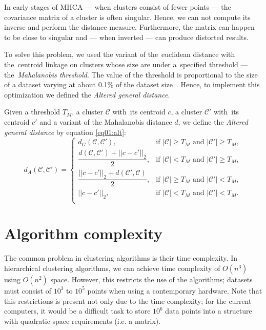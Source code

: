 In early stages of MHCA --- when clusters consist of fewer points --- the covariance matrix of a cluster is often singular. Hence, we can not compute its inverse and perform the distance measure. Furthermore, the matrix can happen to be close to singular and --- when inverted --- can produce distorted results.

To solve this problem, we used the variant of the~euclidean distance with the~centroid linkage on clusters whose size are under a~specified threshold --- the~\emph{Mahalanobis threshold}. The value of the threshold is proportional to the size of a dataset varying at about 0.1\% of the dataset size~\cite{fivser2012detection}. Hence, to implement this optimization we defined the \emph{Altered general distance}.

\begin{defn}
	Given a threshold $T_M$, a cluster $\mathcal{C}$ with~its centroid $c$, a cluster $\mathcal{C}'$ with~its centroid $c'$ and a variant of the Mahalanobis distance $d$, we define the \emph{Altered general distance} by equation \ref{eq01:alt}:
	\begin{equation}
	d_A(\mathcal{C},\mathcal{C}')=
	\begin{cases}
	d_G(\mathcal{C}, \mathcal{C}'), & \text{if $|\mathcal{C}|\ge T_M$ and $|\mathcal{C}'|\ge T_M$},\\
	\dfrac{d(\mathcal{C}, \mathcal{C}')+||c-c'||_2}{2}, & \text{if $|\mathcal{C}| < T_M$ and $|\mathcal{C}'|\ge T_M$},\\
	\dfrac{||c-c'||_2+d(\mathcal{C}', \mathcal{C})}{2}, & \text{if $|\mathcal{C}|\ge T_M$ and $|\mathcal{C}'|< T_M$},\\
	||c-c'||_2, & \text{if $|\mathcal{C}|< T_M$ and $|\mathcal{C}'|< T_M$}.\\
	\end{cases}
	\label{eq01:alt}
	\end{equation}
	\label{def01:alt}
\end{defn}



\section{Algorithm complexity}

The common problem in clustering algorithms is their time complexity. In hierarchical clustering algorithms, we can achieve time complexity of $O(n^3)$ using $O(n^2)$ space. However, this restricts the use of the algorithms; datasets must consist of $10^3$ to $10^5$ points when using a contemporary hardware. Note that this restrictions is present not only due to the time complexity; for the current computers, it would be a difficult task to store $10^6$ data points into a structure with quadratic space requirements (i.e. a matrix).

